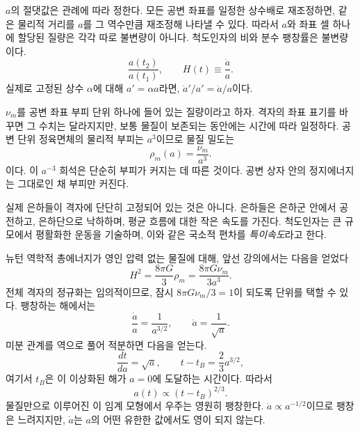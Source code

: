 \(a\)의 절댓값은 관례에 따라 정한다. 모든 공변 좌표를 일정한 상수배로 재조정하면, 같은 물리적 거리를 \(a\)를 그 역수만큼 재조정해 나타낼 수 있다. 따라서 \(a\)와 좌표 셀 하나에 할당된 질량은 각각 따로 불변량이 아니다. 척도인자의 비와 분수 팽창률은 불변량이다.
\begin{equation}
\frac{a(t_2)}{a(t_1)},
\qquad
H(t)\equiv\frac{\dot a}{a}.
\label{eq:c02-hubble}
\end{equation}
실제로 고정된 상수 \(\alpha\)에 대해 \(a'=\alpha a\)라면, \(\dot a'/a'=\dot a/a\)이다.

\(\nu_m\)를 공변 좌표 부피 단위 하나에 들어 있는 질량이라고 하자. 격자의 좌표 표기를 바꾸면 그 수치는 달라지지만, 보통 물질이 보존되는 동안에는 시간에 따라 일정하다. 공변 단위 정육면체의 물리적 부피는 \(a^3\)이므로 물질 밀도는
\begin{equation}
\boxed{\rho_m(a)=\frac{\nu_m}{a^3}.}
\label{eq:c02-matter-density}
\end{equation}
이다. 이 \(a^{-3}\) 희석은 단순히 부피가 커지는 데 따른 것이다. 공변 상자 안의 정지에너지는 그대로인 채 부피만 커진다.

실제 은하들이 격자에 단단히 고정되어 있는 것은 아니다. 은하들은 은하군 안에서 공전하고, 은하단으로 낙하하며, 평균 흐름에 대한 작은 속도를 가진다. 척도인자는 큰 규모에서 평활화한 운동을 기술하며, 이와 같은 국소적 편차를 \emph{특이속도}라고 한다.

\begin{classroomqa}
\end{classroomqa}

뉴턴 역학적 총에너지가 영인 압력 없는 물질에 대해, 앞선 강의에서는 다음을 얻었다
\begin{equation}
H^2=\frac{8\pi G}{3}\rho_m
=\frac{8\pi G\nu_m}{3a^3}.
\label{eq:c02-zero-energy-friedmann}
\end{equation}
전체 격자의 정규화는 임의적이므로, 잠시 \(8\pi G\nu_m/3=1\)이 되도록 단위를 택할 수 있다. 팽창하는 해에서는
\begin{equation}
\frac{\dot a}{a}=\frac{1}{a^{3/2}},
\qquad
\dot a=\frac{1}{\sqrt a}.
\end{equation}
미분 관계를 역으로 풀어 적분하면 다음을 얻는다.
\begin{equation}
\frac{dt}{da}=\sqrt a,
\qquad
t-t_B=\frac{2}{3}a^{3/2},
\end{equation}
여기서 \(t_B\)은 이 이상화된 해가 \(a=0\)에 도달하는 시간이다. 따라서
\begin{equation}
\boxed{a(t)\propto (t-t_B)^{2/3}.}
\label{eq:c02-matter-law}
\end{equation}
물질만으로 이루어진 이 임계 모형에서 우주는 영원히 팽창한다. \(\dot a\propto a^{-1/2}\)이므로 팽창은 느려지지만, \(\dot a\)는 \(a\)의 어떤 유한한 값에서도 영이 되지 않는다.

